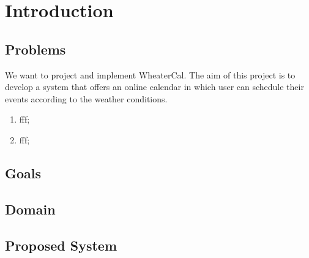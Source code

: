 \chapter{Introduction} \label{cap:cap1}

\section{Problems}
We want to project and implement WheaterCal. The aim of this project is to develop a system that offers an online calendar in which user can schedule their events according to the weather conditions.
\begin{enumerate}
\item fff;
\item fff;
\end{enumerate}

\section{Goals}
\section{Domain}
\section{Proposed System}


 